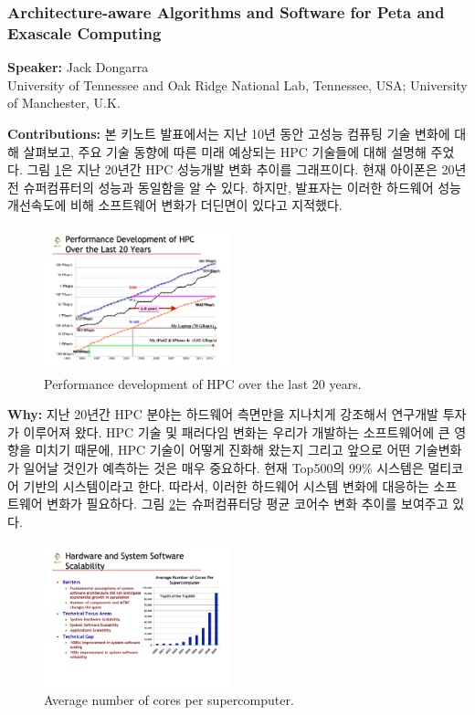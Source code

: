\documentclass[twocolumn]{article}
\begin{document}
\subsubsection{Architecture-aware Algorithms and Software for Peta and Exascale Computing}
\textbf{Speaker:} Jack Dongarra\\
University of Tennessee and Oak Ridge National Lab, Tennessee, USA; University of Manchester, U.K.

\noindent
\textbf{Contributions:} 본 키노트 발표에서는 지난 10년 동안 고성능 컴퓨팅 기술 변화에 대해 살펴보고, 주요 기술 동향에 따른 미래 예상되는 HPC 기술들에 대해 설명해 주었다. 그림 \ref{fig:hpc_20}은 지난 20년간 HPC 성능개발 변화 추이를 그래프이다. 현재 아이폰은 20년전 슈퍼컴퓨터의 성능과 동일함을 알 수 있다. 하지만, 발표자는 이러한 하드웨어 성능 개선속도에 비해 소프트웨어 변화가 더딘면이 있다고 지적했다.

\begin{figure}[htb]
        \centering
        \includegraphics[width=0.48\textwidth]{hpc-20-years.pdf}
        \caption{Performance development of HPC over the last 20 years.}
        \label{fig:hpc_20}
\end{figure}
\noindent
\textbf{Why:}  지난 20년간 HPC 분야는 하드웨어 측면만을 지나치게 강조해서 연구개발 투자가 이루어져 왔다. HPC 기술 및 패러다임 변화는 우리가 개발하는 소프트웨어에 큰 영향을 미치기 때문에, HPC 기술이 어떻게 진화해 왔는지 그리고 앞으로 어떤 기술변화가 일어날 것인가 예측하는 것은 매우 중요하다. 현재 Top500의 99\% 시스템은 멀티코어 기반의 시스템이라고 한다. 따라서, 이러한 하드웨어 시스템 변화에 대응하는 소프트웨어 변화가 필요하다. 그림 \ref{fig:hpc_cores}는 슈퍼컴퓨터당 평균 코어수 변화 추이를 보여주고 있다.

\begin{figure}[htb]
        \centering
        \includegraphics[width=0.48\textwidth]{hpc_cores.pdf}
        \caption{Average number of cores per supercomputer.}
        \label{fig:hpc_cores}
\end{figure}
\end{document}
